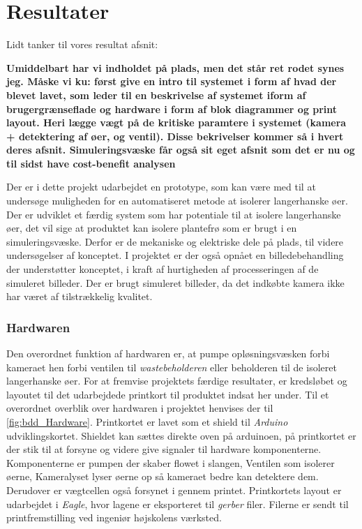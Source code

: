 \chapter{Resultater}
Lidt tanker til vores resultat afsnit:

\textbf{Umiddelbart har vi indholdet på plads, men det står ret rodet synes jeg. Måske vi ku: først give en intro til systemet i form af hvad der blevet lavet, som leder til en beskrivelse af systemet iform af brugergrænseflade og hardware i form af blok diagrammer og print layout. 
Heri lægge vægt på de kritiske paramtere i systemet (kamera + detektering af øer, og ventil).
Disse bekrivelser kommer så i hvert deres afsnit.
Simuleringsvæske får også sit eget afsnit som det er nu og til sidst have cost-benefit analysen} 







Der er i dette projekt udarbejdet en prototype, som kan være med til at undersøge muligheden for en automatiseret metode at isolerer langerhanske øer. Der er udviklet et færdig system som har potentiale til at isolere langerhanske øer, det vil sige at produktet kan isolere plantefrø som er brugt i en simuleringsvæske. Derfor er de mekaniske og elektriske dele på plads, til videre undersøgelser af konceptet. I projektet er der også opnået en billedebehandling der understøtter konceptet, i kraft af hurtigheden af processeringen af de simuleret billeder. Der er brugt simuleret billeder, da det indkøbte kamera ikke har været af tilstrækkelig kvalitet.

\subsection{Hardwaren}
Den overordnet funktion af hardwaren er, at pumpe opløsningsvæsken forbi kameraet hen forbi ventilen til \textit{wastebeholderen} eller beholderen til de isoleret langerhanske øer. For at fremvise projektets færdige resultater, er kredsløbet og layoutet til det udarbejdede printkort til produktet indsat her under. Til et overordnet overblik over hardwaren i projektet henvises der til \ref{fig:bdd_Hardware}. Printkortet er lavet som et shield til \textit{Arduino} udviklingskortet. Shieldet kan sættes direkte oven på arduinoen, på printkortet er der stik til at forsyne og videre give signaler til hardware komponenterne. Komponenterne er pumpen der skaber flowet i slangen, Ventilen som isolerer øerne, Kameralyset lyser øerne op så kameraet bedre kan detektere dem. Derudover er vægtcellen også forsynet i gennem printet. Printkortets layout er udarbejdet i \textit{Eagle}, hvor lagene er eksporteret til \textit{gerber} filer. Filerne er sendt til printfremstilling ved ingeniør højskolens værksted.

